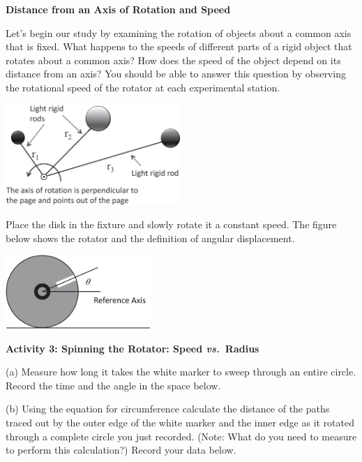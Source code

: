 \pagebreak[3]

\textbf{Distance from an Axis of Rotation and Speed }

Let's begin our study by examining the rotation of objects about a common axis
that is fixed. What happens to the speeds of different parts of a rigid object
that rotates about a common axis? How does the speed of the object depend on
its distance from an axis? You should be able to answer this question by observing
the rotational speed of the rotator at each experimental station.

\vspace{0.3cm}
{\par\centering \includegraphics[height=1.5in]{rotation/rotation_fig5_new.eps} \par}
\vspace{0.3cm}

Place the disk in the fixture and slowly rotate it a constant speed. The figure
below shows the rotator and the definition of angular displacement.

\vspace{0.3cm}
{\par\centering \includegraphics[height=1.1in]{rotation/rotation_fig6_new.eps} \par}
\vspace{0.3cm}

\textbf{Activity 3: Spinning the Rotator: Speed \textit{vs.}~Radius} 

(a) Measure how long it takes the white marker to sweep through an entire circle.
Record the time and the angle in the space below.
\answerspace{10mm}

(b) Using the equation for circumference calculate the distance of the paths traced out by 
the outer edge of the white marker and the inner edge as it rotated through a complete circle you just recorded.
(Note: What do you need to measure to perform this calculation?) Record your
data below.
\answerspace{15mm}

